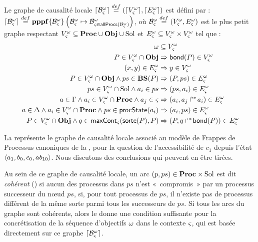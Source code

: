 \begin{definition}
  Le graphe de causalité locale $\lceil \mathcal{B}_\varsigma^\omega\rceil \stackrel{def}= (\lceil V_\varsigma^\omega\rceil, \lceil E_\varsigma^\omega\rceil)$ est défini par :
  $\lceil \mathcal{B}_\varsigma^\omega\rceil \stackrel{def}= \mathbf{pppf}\{\mathcal{B}^\omega_\varsigma\}\left(\mathcal{B}^\omega_\varsigma\mapsto\mathcal{B}^\omega_{\varsigma \Cap \mathsf{allProcs}(\mathcal{B}^\omega_\varsigma)}\right)$,
  où $\mathcal{B}^\omega_\varsigma \stackrel{def}= (V_\varsigma^\omega, E_\varsigma^\omega)$ est le plus petit graphe respectant
  $V_\varsigma^\omega \subseteq \mathbf{Proc} \cup \mathbf{Obj} \cup \mathrm{Sol}$ et $E_\varsigma^\omega \subseteq V_\varsigma^\omega \times V_\varsigma^\omega$
  tel que :
  \begin{align}
    \omega &\subseteq V_\varsigma^\omega \label{eq:Vw} \\
    P \in V_\varsigma^\omega \cap \mathbf{Obj} &\Rightarrow \mathsf{bond}(P) \in V_\varsigma^\omega \label{eq:Vproc} \\
    (x, y) \in E_\varsigma^\omega &\Rightarrow y \in V_\varsigma^\omega \label{eq:VE} \\
    P \in V_\varsigma^\omega \cap \mathbf{Obj} \wedge ps \in \mathbf{BS}(P) &\Rightarrow (P, ps) \in E_\varsigma^\omega \label{eq:ESol1} \\
    ps \in V_\varsigma^\omega \cap \mathrm{Sol} \wedge a_i \in ps &\Rightarrow (ps, a_i) \in E_\varsigma^\omega \label{eq:ESol2} \\
    a \in \Gamma \wedge a_i \in V_\varsigma^\omega \cap \mathbf{Proc} \wedge a_j \in \varsigma &\Rightarrow (a_i, \mbox{${a}_{j}\Rsh^*\!{a}_{i}$}) \in E_\varsigma^\omega \label{eq:EReq} \\
    a \in \Delta \wedge a_i \in V_\varsigma^\omega \cap \mathbf{Proc} \wedge ps \in \mathsf{procState}(a_i) &\Rightarrow (a_i, ps) \in E_\varsigma^\omega \label{eq:EPrio} \\
    P \in V_\varsigma^\omega \cap \mathbf{Obj} \wedge q \in \mathsf{maxCont}_\varsigma(\mathsf{sorte}(P), P) &\Rightarrow (P, \mbox{$q\Rsh^*\!\mathsf{bond}(P)$}) \in E_\varsigma^\omega \label{eq:ECont} \!
  \end{align}
\end{definition}

\begin{example}
  La  représente le graphe de causalité locale
  associé au modèle de Frappes de Processus canoniques de la ,
  pour la question de l'accessibilité de $c_1$ depuis l'état
  $\mbox{$\langle a_1, b_0, c_0, ab_{10} \rangle$}$.
  Nous discutons  des conclusions qui peuvent en être tirées.
\end{example}

Au sein de ce graphe de causalité locale, un arc $(p, ps) \in \mathbf{Proc} \times \mathrm{Sol}$
est dit \emph{cohérent} () si aucun des processus dans $ps$
n'est «~compromis~» par un processus successeur du nœud $ps$,
\cad si, pour tout processus de $ps$,
il n'existe pas de processus différent de la même sorte parmi tous les successeurs de $ps$.
%
Si tous les arcs du graphe sont cohérents, alors le 
donne une condition suffisante pour la concrétisation de la séquence d'objectifs $\omega$
dans le contexte $\varsigma$, qui est basée directement sur ce graphe $\lceil \mathcal{B}_\varsigma^\omega\rceil$.

